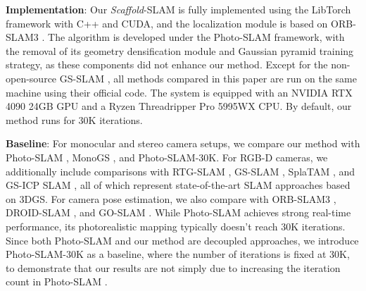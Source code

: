 

\noindent\textbf{Implementation}: Our \emph{Scaffold}-SLAM is fully implemented using the LibTorch framework with C++ and CUDA, and the localization module is based on ORB-SLAM3 \cite{ORB-SLAM32021}. The algorithm is developed under the Photo-SLAM \cite{Photo-SLAM2024} framework, with the removal of its geometry densification module and Gaussian pyramid training strategy, as these components did not enhance our method. Except for the non-open-source GS-SLAM \cite{GS-SLAM2024}, all methods compared in this paper are run on the same machine using their official code. The system is equipped with an NVIDIA RTX 4090 24GB GPU and a Ryzen Threadripper Pro 5995WX CPU. By default, our method runs for 30K iterations.

\noindent\textbf{Baseline}: For monocular and stereo camera setups, we compare our method with Photo-SLAM \cite{Photo-SLAM2024}, MonoGS \cite{MonoGS2024}, and Photo-SLAM-30K. For RGB-D cameras, we additionally include comparisons with RTG-SLAM \cite{RTG-SLAM2024}, GS-SLAM \cite{GS-SLAM2024}, SplaTAM \cite{SplaTAM2024}, and GS-ICP SLAM \cite{GS-ICPSLAM2024}, all of which represent state-of-the-art SLAM approaches based on 3DGS. For camera pose estimation, we also compare with ORB-SLAM3 \cite{ORB-SLAM32021}, DROID-SLAM \cite{DROID-SLAM2021}, and GO-SLAM \cite{GO-SLAM2023}. While Photo-SLAM \cite{Photo-SLAM2024} achieves strong real-time performance, its photorealistic mapping typically doesn't reach 30K iterations. Since both Photo-SLAM \cite{Photo-SLAM2024} and our method are decoupled approaches, we introduce Photo-SLAM-30K as a baseline, where the number of iterations is fixed at 30K, to demonstrate that our results are not simply due to increasing the iteration count in Photo-SLAM \cite{Photo-SLAM2024}.

